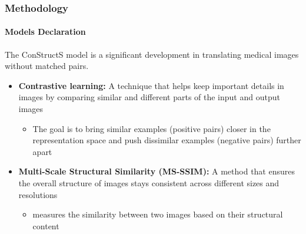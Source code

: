 \documentclass[aspectratio=169, lecture, amberg]{OTHAWbeamer}
\begin{document}
\begin{frame}[t]
    \frametitle{Methodology}
    \framesubtitle{Models Declaration}
    The ConStructS model is a significant development in translating medical images without matched pairs.
    \vspace{0.3cm}
    \begin{itemize}
        \item <1-> \textbf{Contrastive learning:} A technique that helps keep important details in images by comparing similar and different parts of the input and output images
        \vspace{0.3cm}
        \begin{itemize}
            \item The goal is to bring similar examples (positive pairs) closer in the representation space and push dissimilar examples (negative pairs) further apart
        \end{itemize}
        \vspace{0.3cm}
        \item <2-> \textbf{Multi-Scale Structural Similarity (MS-SSIM):} A method that ensures the overall structure of images stays consistent across different sizes and resolutions
        \vspace{0.2cm}
        \begin{itemize}
            \item  measures the similarity between two images based on their structural content
        \end{itemize}
    \end{itemize}
\end{frame}
\end{document}
